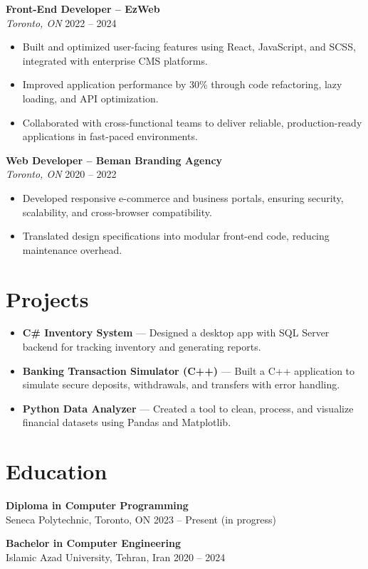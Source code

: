\documentclass[letterpaper,8pt]{article}
\begin{document}
\textbf{Front-End Developer – EzWeb}\\
\textit{Toronto, ON} \hfill 2022 -- 2024
\begin{itemize}[leftmargin=*]
  \item Built and optimized user-facing features using React, JavaScript, and SCSS, integrated with enterprise CMS platforms.
  \item Improved application performance by 30\% through code refactoring, lazy loading, and API optimization.
  \item Collaborated with cross-functional teams to deliver reliable, production-ready applications in fast-paced environments.
\end{itemize}

\textbf{Web Developer – Beman Branding Agency}\\
\textit{Toronto, ON} \hfill 2020 -- 2022
\begin{itemize}[leftmargin=*]
  \item Developed responsive e-commerce and business portals, ensuring security, scalability, and cross-browser compatibility.
  \item Translated design specifications into modular front-end code, reducing maintenance overhead.
\end{itemize}

\section*{Projects}
\begin{itemize}[leftmargin=*]
  \item \textbf{C\# Inventory System} — Designed a desktop app with SQL Server backend for tracking inventory and generating reports.
  \item \textbf{Banking Transaction Simulator (C++)} — Built a C++ application to simulate secure deposits, withdrawals, and transfers with error handling.
  \item \textbf{Python Data Analyzer} — Created a tool to clean, process, and visualize financial datasets using Pandas and Matplotlib.
\end{itemize}

\section*{Education}
\textbf{Diploma in Computer Programming} \\ Seneca Polytechnic, Toronto, ON \hfill 2023 -- Present (in progress)

\textbf{Bachelor in Computer Engineering} \\ Islamic Azad University, Tehran, Iran \hfill 2020 -- 2024
\end{document}

